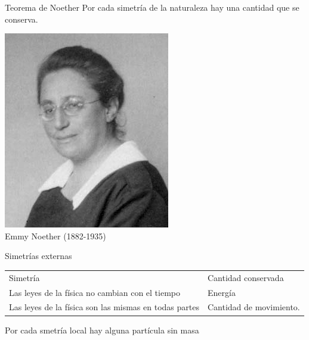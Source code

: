 \documentclass[%
xcolor=pdftex,dvipsnames,table%
]{beamer}
\begin{document}
\begin{frame}{Teorema de Noether}
  Por cada \alert{simetría} de la naturaleza hay una \alert{cantidad que se conserva}.

  \begin{flushright}
    \includegraphics[scale=0.35]{Noether}\\
    Emmy Noether (1882-1935)
  \end{flushright}
\end{frame}
\begin{frame}{Simetrías externas}
\begin{tabular}{p{}p{}}
  Simetría  & Cantidad conservada\\
  Las leyes de la física no cambian con el tiempo & Energía\\
  Las leyes de la física son las mismas en todas partes & Cantidad de movimiento.
\end{tabular}
\end{frame}
\begin{frame}
  Por cada smetría \alert{local} hay alguna partícula \alert{sin masa}
\end{frame}
\end{document}
